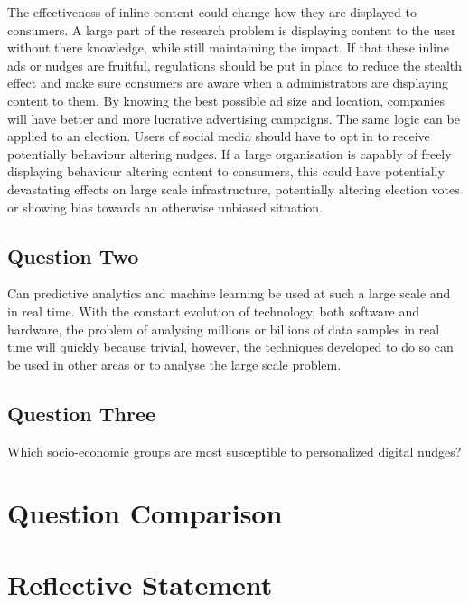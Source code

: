 \documentclass[11pt]{article} %
\begin{document}
The effectiveness of inline content could change how they are displayed to consumers. A large part of the research problem is displaying content to the user without there knowledge, while still maintaining the impact. If that these inline ads or nudges are fruitful, regulations should be put in place to reduce the stealth effect and make sure consumers are aware when a administrators are displaying content to them. By knowing the best possible ad size and location, companies will have better and more lucrative advertising campaigns. The same logic can be applied to an election. Users of social media should have to opt in to receive potentially behaviour altering nudges. If a large organisation is capably of freely displaying behaviour altering content to consumers, this could have potentially devastating effects on large scale infrastructure, potentially altering election votes or showing bias towards an otherwise unbiased situation. 


\subsection{Question Two}
Can predictive analytics and machine learning be used at such a large scale and in real time. With the constant evolution of technology, both software and hardware, the problem of analysing millions or billions of data samples in real time will quickly because trivial, however, the techniques developed to do so can be used in other areas or to analyse the large scale problem. 

\subsection{Question Three}
Which socio-economic groups are most susceptible to personalized digital nudges?


\section{Question Comparison}


\newpage


 

\newpage
\section{Reflective Statement}

\end{document}
